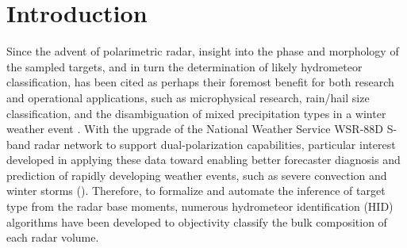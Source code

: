 \documentclass{agujournal}
\begin{document}

%
%
%
%


\section{Introduction}

Since the advent of polarimetric radar, insight into the phase and morphology of the sampled targets, and in turn the determination of likely hydrometeor classification, has been cited as perhaps their foremost benefit for both research and operational applications, such as microphysical research, rain/hail size classification, and the disambiguation of mixed precipitation types in a winter weather event \parencite{Zrnic1999}. With the upgrade of the National Weather Service WSR-88D S-band radar network to support dual-polarization capabilities, particular interest developed in applying these data toward enabling better forecaster diagnosis and prediction of rapidly developing weather events, such as severe convection and winter storms (\cite{Elmore2011}). Therefore, to formalize and automate the inference of target type from the radar base moments, numerous hydrometeor identification (HID) algorithms have been developed to objectivity classify the bulk composition of each radar volume.
\end{document}
